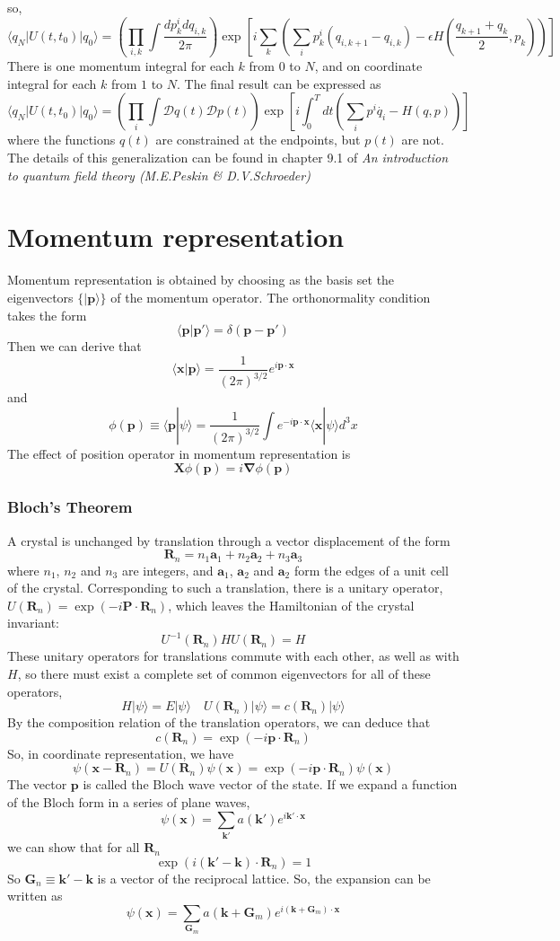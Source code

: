 so,
\[\langle q_{N} | U(t,t_0) | q_{0}\rangle = \left( \prod_{i,k} \int \frac{dp^i_k dq_{i,k}}{2\pi}\right) \exp \left[ i\sum_k \left( \sum_i p_k^i (q_{i,k+1} - q_{i,k})-\epsilon H \left( \frac{q_{k+1}+q_{k}}{2},p_k\right)\right) \right]\]
There is one momentum integral for each $k$ from $0$ to $N$, and on coordinate integral for each $k$ from $1$ to $N$.
The final result can be expressed as
\[\langle q_{N} | U(t,t_0) | q_{0}\rangle = \left( \prod_{i} \int \mathcal{D}q(t) \mathcal{D}p(t) \right) \exp \left[ i \int_0^T dt \left( \sum_i p^i \dot{q_i} - H \left( q,p\right)\right) \right]\]
where the functions $q(t)$ are constrained at the endpoints, but $p(t)$ are not. 
The details of this generalization can be found in  chapter 9.1 of \emph{An introduction to quantum field theory (M.E.Peskin \& D.V.Schroeder)}

\section{Momentum representation}
Momentum representation is obtained by choosing as the basis set the eigenvectors $\{|\bm{p}\rangle\}$ of the momentum operator. The orthonormality condition takes the form
\[\langle \bm{p} | \bm{p}' \rangle = \delta(\bm{p}-\bm{p}')\]
Then we can derive that
\[\langle \bm{x} | \bm{p} \rangle = \frac{1}{(2\pi)^{3/2}} e^{i\bm{p}\cdot\bm{x}}\]
and
\[\phi(\bm{p}) \equiv \langle \bm{p} | \psi \rangle = \frac{1}{(2\pi)^{3/2}} \int e^{-i\bm{p}\cdot\bm{x}} \langle \bm{x} | \psi \rangle d^3 x\]
The effect of position operator in momentum representation is
\[\bm{X}\phi(\bm{p}) = i\bm{\nabla} \phi(\bm{p})\]
\subsubsection{Bloch's Theorem}
A crystal is unchanged by translation through a vector displacement of the form
\[\bm{R}_n = n_1\bm{a}_1 + n_2\bm{a}_2 + n_3\bm{a}_3\]
where $n_1$, $n_2$ and $n_3$ are integers, and $\bm{a}_1$, $\bm{a}_2$ and $\bm{a}_2$ form the edges of a unit cell of the crystal. Corresponding to such a translation, there is a unitary operator, $U(\bm{R}_n) = \exp(-i\bm{P}\cdot \bm{R}_n)$, which leaves the Hamiltonian of the crystal invariant:
\[U^{-1}(\bm{R}_n) H U(\bm{R}_n) = H\]
These unitary operators for translations commute with each other, as well as with $H$, so there must exist a complete set of common eigenvectors for all of these operators,
\[H|\psi\rangle = E|\psi\rangle \quad U(\bm{R}_n)|\psi\rangle = c(\bm{R}_n)|\psi\rangle\]
By the composition relation of the translation operators, we can deduce that
\[c(\bm{R}_n) = \exp(-i\bm{p}\cdot\bm{R}_n)\]
So, in coordinate representation, we have
\[\psi(\bm{x} - \bm{R}_n) = U(\bm{R}_n) \psi(\bm{x}) = \exp(-i\bm{p}\cdot\bm{R}_n) \psi(\bm{x})\]
The vector $\bm{p}$ is called the Bloch wave vector of the state. If we expand a function of the Bloch form in a series of plane waves, 
\[\psi(\bm{x}) = \sum_{\bm{k}'} a(\bm{k}') e^{i\bm{k}'\cdot \bm{x}}\]
we can show that for all $\bm{R}_n$
\[\exp(i(\bm{k}' - \bm{k})\cdot \bm{R}_n) = 1 \]
So $\bm{G}_n \equiv \bm{k}' - \bm{k}$ is a vector of the reciprocal lattice. So, the expansion can be written as
\[\psi(\bm{x}) = \sum_{\bm{G}_m} a(\bm{k} + \bm{G}_m) e^{i(\bm{k} + \bm{G}_m)\cdot\bm{x}}\]

